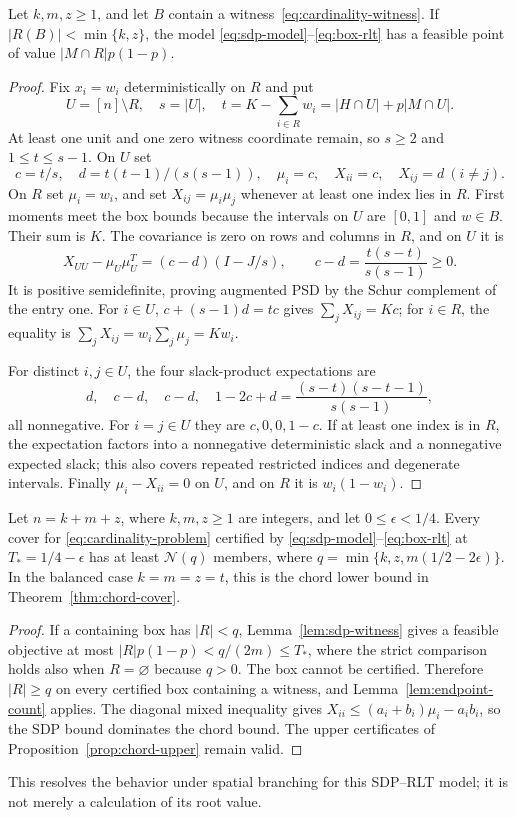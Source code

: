 \begin{lemma}\label{lem:sdp-witness}
Let $k,m,z\ge1$, and let $B$ contain a witness~\eqref{eq:cardinality-witness}.
If $|R(B)|<\min\{k,z\}$, the model
\eqref{eq:sdp-model}--\eqref{eq:box-rlt} has a feasible point of value
$|M\cap R|p(1-p)$.
\end{lemma}
\begin{proof}
Fix $x_i=w_i$ deterministically on $R$ and put
\[
 U=[n]\setminus R,\quad s=|U|,\quad
 t=K-\sum_{i\in R}w_i=|H\cap U|+p|M\cap U|.
\]
At least one unit and one zero witness coordinate remain, so $s\ge2$
and $1\le t\le s-1$. On $U$ set
\[
 c=t/s,\quad d=t(t-1)/(s(s-1)),\quad
 \mu_i=c,\quad X_{ii}=c,\quad X_{ij}=d\ (i\ne j).
\]
On $R$ set $\mu_i=w_i$, and set $X_{ij}=\mu_i\mu_j$ whenever at least
one index lies in $R$. First moments meet the box bounds because the
intervals on $U$ are $[0,1]$ and $w\in B$. Their sum is $K$.
The covariance is zero on rows and columns in $R$, and on $U$ it is
\[
 X_{UU}-\mu_U\mu_U^T
 =(c-d)(I-J/s),\qquad c-d=\frac{t(s-t)}{s(s-1)}\ge0.
\]
It is positive semidefinite, proving augmented PSD by the Schur complement
of the entry one. For $i\in U$,
$c+(s-1)d=tc$ gives $\sum_jX_{ij}=Kc$; for $i\in R$, the equality
is $\sum_jX_{ij}=w_i\sum_j\mu_j=Kw_i$.

For distinct $i,j\in U$, the four slack-product expectations are
\[
 d,\quad c-d,\quad c-d,\quad
 1-2c+d=\frac{(s-t)(s-t-1)}{s(s-1)},
\]
all nonnegative. For $i=j\in U$ they are $c,0,0,1-c$.
If at least one index is in $R$, the expectation factors into a
nonnegative deterministic slack and a nonnegative expected slack; this
also covers repeated restricted indices and degenerate intervals.
Finally $\mu_i-X_{ii}=0$ on $U$, and on $R$ it is $w_i(1-w_i)$.
\end{proof}

\begin{theorem}\label{thm:sdp-cover}
Let $n=k+m+z$, where $k,m,z\ge1$ are integers, and let
$0\le\epsilon<1/4$. Every cover for
\eqref{eq:cardinality-problem} certified by
\eqref{eq:sdp-model}--\eqref{eq:box-rlt} at $T_*=1/4-\epsilon$ has
at least $\mathcal N(q)$ members, where
$q=\min\{k,z,m(1/2-2\epsilon)\}$.
In the balanced case $k=m=z=t$, this is the chord lower bound in
Theorem~\ref{thm:chord-cover}.
\end{theorem}
\begin{proof}
If a containing box has $|R|<q$, Lemma~\ref{lem:sdp-witness} gives a
feasible objective at most $|R|p(1-p)<q/(2m)\le T_*$, where the
strict comparison holds also when $R=\varnothing$ because $q>0$.
The box cannot be certified. Therefore $|R|\ge q$ on every certified
box containing a witness, and Lemma~\ref{lem:endpoint-count} applies.
The diagonal mixed inequality gives
$X_{ii}\le(a_i+b_i)\mu_i-a_ib_i$, so the SDP bound dominates the
chord bound. The upper certificates of Proposition~\ref{prop:chord-upper}
remain valid.
\end{proof}
This resolves the behavior under spatial branching for this SDP--RLT
model; it is not merely a calculation of its root value.

